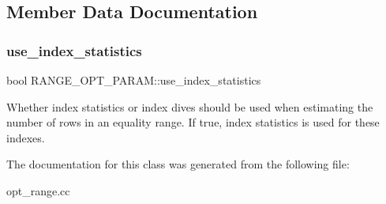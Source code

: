 \subsection{Member Data Documentation}
\mbox{\label{classRANGE__OPT__PARAM_a4849251021b18cc47419b75aa454eda9}} 
\subsubsection{\texorpdfstring{use\+\_\+index\+\_\+statistics}{use\_index\_statistics}}
{\footnotesize\ttfamily bool R\+A\+N\+G\+E\+\_\+\+O\+P\+T\+\_\+\+P\+A\+R\+A\+M\+::use\+\_\+index\+\_\+statistics}

Whether index statistics or index dives should be used when estimating the number of rows in an equality range. If true, index statistics is used for these indexes. 

The documentation for this class was generated from the following file\+:\begin{DoxyCompactItemize}
\item 
opt\+\_\+range.\+cc\end{DoxyCompactItemize}
